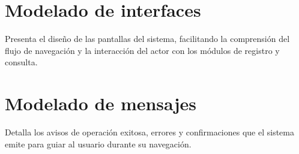     \section{Modelado de interfaces}
    Presenta el diseño de las pantallas del sistema, facilitando la comprensión del flujo de navegación y la interacción del actor con los módulos de registro y consulta.

    \section{Modelado de mensajes}
    Detalla los avisos de operación exitosa, errores y confirmaciones que el sistema emite para guiar al usuario durante su navegación.